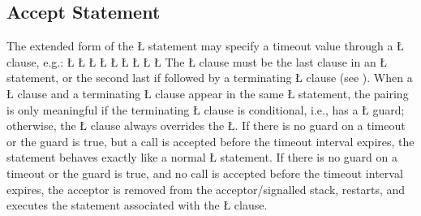 \documentclass[openright,twoside]{report}
\begin{document}
\subsection{Accept Statement}
\label{s:TimeoutAcceptStatement}

The extended form of the \LGinlinetrue\LGbegin\lgrinde\L{}\endlgrinde\LGend{} statement may specify a timeout value through a \LGinlinetrue\LGbegin\lgrinde\L{}\endlgrinde\LGend{} clause, e.g.:
\LGinlinefalse\LGbegin\lgrinde
\L{}
\CE{}\L{\LB{}}
\L{\LB{}}
\CE{}\L{}
\L{\LB{}}
\L{\LB{}}
\L{}
\CE{}\L{\LB{}}
\CE{}\L{\LB{}}
\CE{}\endlgrinde\LGend
{}%
%
%
The \LGinlinetrue\LGbegin\lgrinde\L{}\endlgrinde\LGend{} clause must be the last clause in an \LGinlinetrue\LGbegin\lgrinde\L{}\endlgrinde\LGend{} statement, or the second last if followed by a terminating \LGinlinetrue\LGbegin\lgrinde\L{}\endlgrinde\LGend{} clause (see ).
When a \LGinlinetrue\LGbegin\lgrinde\L{}\endlgrinde\LGend{} clause and a terminating \LGinlinetrue\LGbegin\lgrinde\L{}\endlgrinde\LGend{} clause appear in the same \LGinlinetrue\LGbegin\lgrinde\L{}\endlgrinde\LGend{} statement, the pairing is only meaningful if the terminating \LGinlinetrue\LGbegin\lgrinde\L{}\endlgrinde\LGend{} clause is conditional, i.e., has a \LGinlinetrue\LGbegin\lgrinde\L{}\endlgrinde\LGend{} guard;
otherwise, the \LGinlinetrue\LGbegin\lgrinde\L{}\endlgrinde\LGend{} clause always overrides the \LGinlinetrue\LGbegin\lgrinde\L{}\endlgrinde\LGend{}.
If there is no guard on a timeout or the guard is true, but a call is accepted before the timeout interval expires, the statement behaves exactly like a normal \LGinlinetrue\LGbegin\lgrinde\L{}\endlgrinde\LGend{} statement.
If there is no guard on a timeout or the guard is true, and no call is accepted before the timeout interval expires, the acceptor is removed from the acceptor/signalled stack, restarts, and executes the statement associated with the \LGinlinetrue\LGbegin\lgrinde\L{}\endlgrinde\LGend{} clause.
\end{document}
